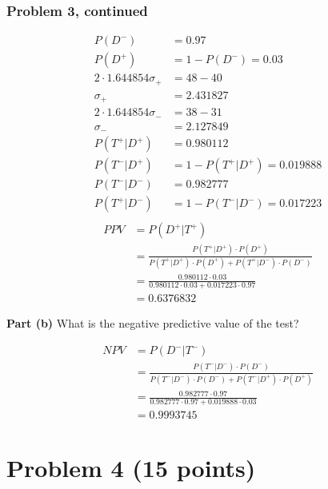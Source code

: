 \documentclass[12pt]{article}
\theoremstyle{definition}
\begin{document}
\subsubsection*{Problem 3, continued}
\begin{align*}
P(D^-) &= 0.97\\
P(D^+) &= 1 - P(D^-) = 0.03\\
2\cdot 1.644854\sigma_+ &= 48 - 40\\
\sigma_+ &= 2.431827\\
2\cdot 1.644854\sigma_- &= 38 - 31\\
\sigma_- &= 2.127849\\
P(T^+|D^+) &= 0.980112\\
P(T^-|D^+) &= 1 - P(T^+|D^+) = 0.019888\\
P(T^-|D^-) &= 0.982777\\
P(T^+|D^-) &= 1 - P(T^-|D^-) = 0.017223\\
\end{align*}
\begin{align*}
PPV &= P(D^+|T^+)\\
&= \frac{P(T^+|D^+) \cdot P(D^+)}{P(T^+|D^+) \cdot P(D^+) + P(T^+|D^-) \cdot P(D^-)}\\
&= \frac{0.980112 \cdot 0.03}{0.980112 \cdot 0.03 + 0.017223 \cdot 0.97}\\
&= 0.6376832
\end{align*}

\noindent
{\bf Part (b)} What is the negative predictive value of the test?

\begin{align*}
NPV &= P(D^-|T^-)\\
&= \frac{P(T^-|D^-)\cdot P(D^-)}{P(T^-|D^-)\cdot P(D^-) + P(T^-|D^+)\cdot P(D^+)}\\
&= \frac{0.982777 \cdot 0.97}{0.982777 \cdot 0.97 + 0.019888 \cdot 0.03}\\
&= 0.9993745
\end{align*}







\newpage
\section*{Problem 4 (15 points)}
\end{document}
